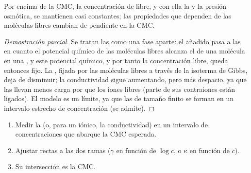 \begin{proposition}\label{prop:b3:colloids:cmc-break}
Por encima de la CMC, la concentración de  libre, y con ella la  y la presión osmótica, se mantienen casi constantes; las propiedades que dependen
de las moléculas libres cambian de pendiente en la CMC.
\end{proposition}

\begin{proof}[Demostración parcial]
Se tratan las  como una fase aparte: el  añadido pasa a las  en cuanto
el potencial químico de las moléculas libres alcanza el de una molécula en una
, y este potencial químico, y por tanto la concentración libre, queda entonces
fijo. La , fijada por las moléculas libres a través de la isoterma de
Gibbs, deja de disminuir; la conductividad sigue aumentando, pero más despacio, ya que
las  llevan menos carga por  que los iones libres (parte de sus
contraiones están ligados). El modelo es un límite, ya que las  de tamaño finito
se forman en un intervalo estrecho de concentración (se admite).
\end{proof}

\begin{method}\label{met:b3:colloids:cmc}
\begin{enumerate}
  \item Medir la  (o, para un  iónico, la
        conductividad) en un intervalo de concentraciones que abarque la CMC
        esperada.
  \item Ajustar rectas a las dos ramas ($\gamma$ en función de $\log c$, o $\kappa$ en función de $c$).
  \item Su intersección es la CMC.
\end{enumerate}
\end{method}

